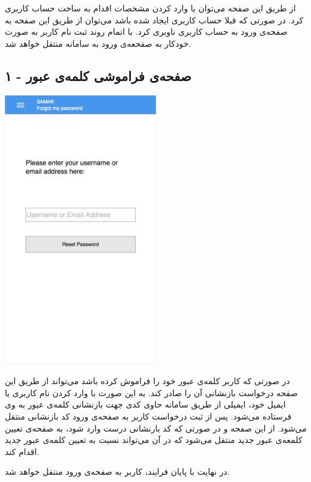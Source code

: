 از طریق این صفحه می‌توان با وارد کردن مشخصات اقدام به ساخت حساب کاربری کرد. در صورتی که قبلا حساب کاربری ایجاد شده باشد می‌توان از طریق این صفحه به صفحه‌ی ورود به حساب کاربری ناوبری کرد.
با اتمام روند ثبت نام کاربر به صورت خودکار به صفحعه‌ی ورود به سامانه منتقل خواهد شد.


\subsection{صفحه‌ی فراموشی کلمه‌ی عبور - ۱}

\begin{center}
\includegraphics[width = 0.5\textwidth]{images/4-forgot-password-1.png}
\end{center}

در صورتی که کاربر کلمه‌ی عبور خود را فراموش کرده باشد می‌تواند از طریق این صفحه درخواست بازنشانی آن را صادر کند. به این صورت با وارد کردن نام کاربری یا ایمیل خود، ایمیلی از طریق سامانه حاوی کدی جهت بازنشانی کلمه‌ی عبور به وی فرستاده می‌شود.  پس از ثبت درخواست کاربر به صفحه‌ی ورود کد بازنشانی منتقل می‌شود. از این صفحه و در صورتی که کد بارنشانی درست وارد شود، به صفحه‌ی تعیین کلمعه‌ی عبور جدید منتقل می‌شود که در آن می‌تواند نسبت به تعیین کلمه‌ی عبور جدید اقدام کند.

در نهایت با پایان فرایند، کاربر به صفحه‌ی ورود منتقل خواهد شد.





